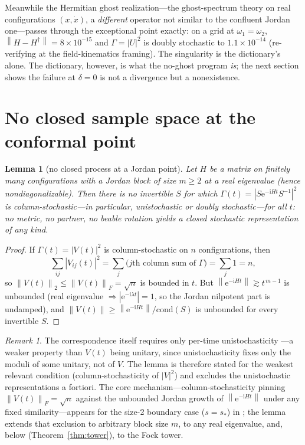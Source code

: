 \documentclass[11pt]{article}
\newtheorem{lemma}[theorem]{Lemma}
\theoremstyle{definition}
\theoremstyle{remark}
\newtheorem{remark}[theorem]{Remark}
\newcommand{\ii}{\mathrm{i}}
\newcommand{\ee}{\mathrm{e}}
\newcommand{\norm}[1]{\left\lVert #1 \right\rVert}
\begin{document}
Meanwhile the Hermitian ghost realization---the
ghost-spectrum theory on real configurations $(x,\dot x)$, a
\emph{different} operator not similar to the confluent Jordan
one---passes
through the exceptional point exactly: on a grid at
$\omega_1=\omega_2$, $\norm{H-H^{\dagger}}=8\times10^{-15}$ and
$\Gamma=|U|^{2}$ is doubly stochastic to $1.1\times10^{-14}$
(re-verifying \cite{indivisible} at the field-kinematics framing).
The singularity is the dictionary's alone. The dictionary, however,
is what the no-ghost program \emph{is}; the next section shows the
failure at $\delta=0$ is not a divergence but a nonexistence.

\section{No closed sample space at the conformal point}
\label{sec:lemma}

\begin{lemma}[no closed process at a Jordan point]
\label{lem:jordan}
Let $H$ be a matrix on finitely many
configurations with a Jordan block of size $m\ge2$ at a
real eigenvalue (hence nondiagonalizable). Then there is no invertible $S$ for which
$\Gamma(t)=|S\ee^{-\ii Ht}S^{-1}|^{2}$ is column-stochastic---in
particular, unistochastic or doubly stochastic---for all $t$: no
metric, no partner, no beable rotation yields a closed stochastic
representation of any kind.
\end{lemma}

\begin{proof}
If $\Gamma(t)=|V(t)|^{2}$ is column-stochastic on $n$
configurations, then
\[
\sum_{ij}|V_{ij}(t)|^{2}
=\sum_{j}\bigl(\text{$j$th column sum of }\Gamma\bigr)
=\sum_{j}1=n,
\]
so $\norm{V(t)}_{2}\le\norm{V(t)}_{F}=\sqrt n$ is bounded in $t$. But
$\norm{\ee^{-\ii Ht}}\gtrsim t^{\,m-1}$ is unbounded (real eigenvalue
$\Rightarrow|\ee^{-\ii\lambda t}|=1$, so the Jordan
nilpotent part is undamped), and
$\norm{V(t)}\ge\norm{\ee^{-\ii Ht}}/\mathrm{cond}(S)$ is unbounded
for every invertible $S$.
\end{proof}

\begin{remark}
The correspondence itself requires only per-time unistochasticity
\cite{indivisible}---a weaker property than $V(t)$ being unitary,
since unistochasticity fixes only the moduli of some unitary, not
of $V$. The lemma is therefore stated for the weakest relevant
condition (column-stochasticity of $|V|^{2}$) and excludes the
unistochastic representations a fortiori. The core mechanism---column-stochasticity
pinning $\norm{V(t)}_{F}=\sqrt n$ against the unbounded Jordan growth
of $\norm{\ee^{-\ii Ht}}$ under any fixed similarity---appears for the
size-2 boundary case ($s=s_*$) in \cite{indivisible}; the lemma extends
that exclusion to arbitrary block size $m$, to any real eigenvalue,
and, below (Theorem~\ref{thm:tower}), to the Fock tower.
\end{remark}
\end{document}
